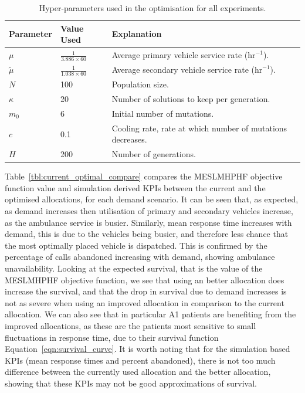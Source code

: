 \documentclass[numbers,webpdf,imaman]{ima-authoring-template}%
\begin{document}
\begin{table}
\centering
\begin{tabular}{lll}
\toprule
Parameter & Value Used & Explanation \\
\midrule
$\mu$ & $\frac{1}{3.886 \times 60}$ & Average primary vehicle service rate ($\text{hr}^{-1}$).\\
$\tilde{\mu}$ & $\frac{1}{1.038 \times 60}$ & Average secondary vehicle service rate ($\text{hr}^{-1}$).\\
$N$ & 100 & Population size.\\
$\kappa$ & 20 & Number of solutions to keep per generation.\\
$m_0$ & 6 & Initial number of mutations.\\
$c$ & 0.1 & Cooling rate, rate at which number of mutations decreases.\\
$H$ & 200 & Number of generations.\\
\bottomrule
\end{tabular}
\caption{Hyper-parameters used in the optimisation for all experiments.}
\label{tbl:hyperparameters}
\end{table}

Table~\ref{tbl:current_optimal_compare} compares the MESLMHPHF objective
function value and simulation derived KPIs between the current and the optimised
allocations, for each demand scenario. It can be seen that, as expected, as
demand increases then utilisation of primary and secondary vehicles increase, as
the ambulance service is busier. Similarly, mean response time increases with
demand, this is due to the vehicles being busier, and therefore less chance that
the most optimally placed vehicle is dispatched. This is confirmed by the
percentage of calls abandoned increasing with demand, showing ambulance
unavailability.
Looking at the expected survival, that is the value of the MESLMHPHF objective
function, we see that using an better allocation does increase the survival,
and that the drop in survival due to demand increases is not as severe when
using an improved allocation in comparison to the current allocation. We can
also see that in particular A1 patients are benefiting from the improved
allocations, as these are the patients most sensitive to small fluctuations in
response time, due to their survival function Equation~\ref{eqn:survival_curve}.
It is worth noting that for the simulation based KPIs (mean response times and
percent abandoned), there is not too much
difference between the currently used allocation and the better allocation,
showing that these KPIs may not be good approximations of survival.
\end{document}

